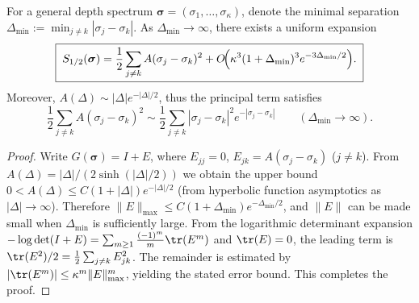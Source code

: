 %

\begin{proposition}\label{prop:xi-hellinger-cluster-expansion-large-separation}
For a general depth spectrum \(\boldsymbol{\sigma}=(\sigma_1,\dots,\sigma_\kappa)\), denote the minimal separation
\(
\Delta_{\min}:=\min_{j\neq k}|\sigma_j-\sigma_k|
\).
As \(\Delta_{\min}\to\infty\), there exists a uniform expansion
\[
\boxed{\;
S_{1/2}(\boldsymbol{\sigma})
=\frac12\sum_{j\neq k}A(\sigma_j-\sigma_k)^{2}
+O\!\Bigl(\kappa^{3}(1+\Delta_{\min})^{3}e^{-3\Delta_{\min}/2}\Bigr).\;}
\]
Moreover,
\(
A(\Delta)\sim |\Delta|e^{-|\Delta|/2}
\), thus the principal term satisfies
\[
\frac12\sum_{j\neq k}A(\sigma_j-\sigma_k)^2
\sim \frac12\sum_{j\neq k}|\sigma_j-\sigma_k|^2e^{-|\sigma_j-\sigma_k|}
\qquad(\Delta_{\min}\to\infty).
\]
\end{proposition}
\begin{proof}
Write \(G(\boldsymbol{\sigma})=I+E\), where \(E_{jj}=0\), \(E_{jk}=A(\sigma_j-\sigma_k)\) (\(j\neq k\)).
From \(A(\Delta)=|\Delta|/(2\sinh(|\Delta|/2))\) we obtain the upper bound
\(
0<A(\Delta)\le C(1+|\Delta|)e^{-|\Delta|/2}
\)
(from hyperbolic function asymptotics as \(|\Delta|\to\infty\)).
Therefore \(\|E\|_{\max}\le C(1+\Delta_{\min})e^{-\Delta_{\min}/2}\), and \(\|E\|\) can be made small when \(\Delta_{\min}\) is sufficiently large.
From the logarithmic determinant expansion
\(
-\log\det(I+E)=\sum_{m\ge 1}\frac{(-1)^m}{m}\tr(E^m)
\)
and \(\tr(E)=0\), the leading term is \(\tr(E^2)/2=\frac12\sum_{j\neq k}E_{jk}^2\).
The remainder is estimated by \(|\tr(E^m)|\le \kappa^m\|E\|_{\max}^m\), yielding the stated error bound. This completes the proof.
\end{proof}

